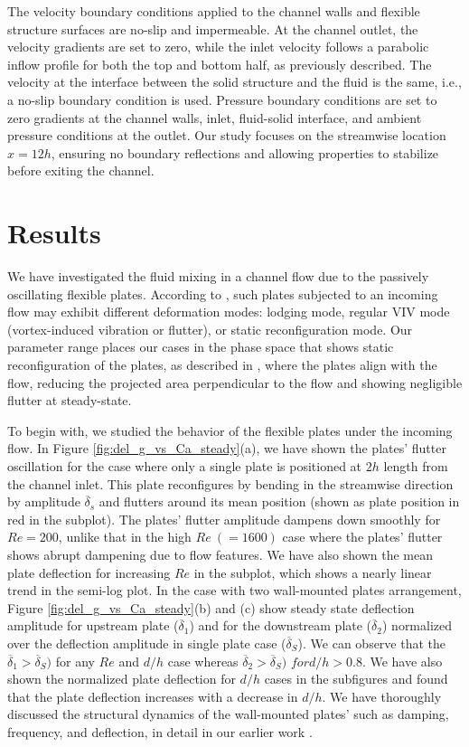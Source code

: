 \documentclass[reprint,a4paper,fleqn]{cas-dc} %
\begin{document}
		
		The velocity boundary conditions applied to the channel walls and flexible structure surfaces are no-slip and impermeable. At the channel outlet, the velocity gradients are set to zero, while the inlet velocity follows a parabolic inflow profile for both the top and bottom half, as previously described. The velocity at the interface between the solid structure and the fluid is the same, i.e., a no-slip boundary condition is used. Pressure boundary conditions are set to zero gradients at the channel walls, inlet, fluid-solid interface, and ambient pressure conditions at the outlet. Our study focuses on the streamwise location $x=12h$, ensuring no boundary reflections and allowing properties to stabilize before exiting the channel.
		
		\section{Results}
		
		We have investigated the fluid mixing in a channel flow due to the passively oscillating flexible plates. According to \cite{Zhang2020}, such plates subjected to an incoming flow may exhibit different deformation modes: lodging mode, regular VIV mode (vortex-induced vibration or flutter), or static reconfiguration mode. Our parameter range places our cases in the phase space that shows static reconfiguration of the plates, as described in \cite{Zhang2020}, where the plates align with the flow, reducing the projected area perpendicular to the flow and showing negligible flutter at steady-state.
		
		To begin with, we studied the behavior of the flexible plates under the incoming flow. 
		In Figure \ref{fig:del_g_vs_Ca_steady}(a), we have shown the plates' flutter oscillation for the case where only a single plate is positioned at $2h$ length from the channel inlet. This plate reconfigures by bending in the streamwise direction by amplitude $\overline{\delta}_s$ and flutters around its mean position (shown as plate position in red in the subplot). The plates' flutter amplitude dampens down smoothly for $Re=200$, unlike that in the high $Re ~(=1600)$ case where the plates' flutter shows abrupt dampening due to flow features. We have also shown the mean plate deflection for increasing $Re$ in the subplot, which shows a nearly linear trend in the semi-log plot. In the case with two wall-mounted plates arrangement, Figure \ref{fig:del_g_vs_Ca_steady}(b) and (c) show steady state deflection amplitude for upstream plate ($\overline{\delta}_1$) and for the downstream plate ($\overline{\delta}_2$) normalized over the deflection amplitude in single plate case ($\overline{\delta}_S$). We can observe that the $\overline{\delta}_1 > \overline{\delta}_S)$ for any $Re$ and $d/h$ case whereas $\overline{\delta}_2 > \overline{\delta}_S)$ $for d/h>0.8$. We have also shown the normalized plate deflection for $d/h$ cases in the subfigures and found that the plate deflection increases with a decrease in $d/h$. We have thoroughly discussed the structural dynamics of the wall-mounted plates' such as damping, frequency, and deflection, in detail in our earlier work \citep{Self2019}.
		
\end{document}
